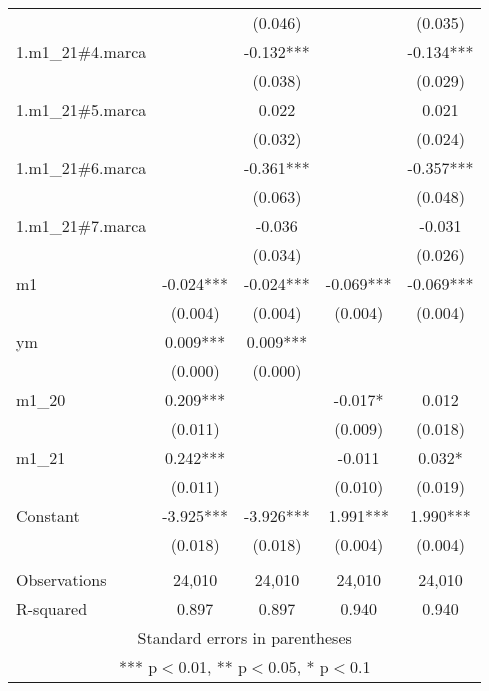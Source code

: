 \begin{tabular}{lcccc}
 &  & (0.046) &  & (0.035) \\
1.m1\_21\#4.marca &  & -0.132*** &  & -0.134*** \\
 &  & (0.038) &  & (0.029) \\
1.m1\_21\#5.marca &  & 0.022 &  & 0.021 \\
 &  & (0.032) &  & (0.024) \\
1.m1\_21\#6.marca &  & -0.361*** &  & -0.357*** \\
 &  & (0.063) &  & (0.048) \\
1.m1\_21\#7.marca &  & -0.036 &  & -0.031 \\
 &  & (0.034) &  & (0.026) \\
m1 & -0.024*** & -0.024*** & -0.069*** & -0.069*** \\
 & (0.004) & (0.004) & (0.004) & (0.004) \\
ym & 0.009*** & 0.009*** &  &  \\
 & (0.000) & (0.000) &  &  \\
m1\_20 & 0.209*** &  & -0.017* & 0.012 \\
 & (0.011) &  & (0.009) & (0.018) \\
m1\_21 & 0.242*** &  & -0.011 & 0.032* \\
 & (0.011) &  & (0.010) & (0.019) \\
Constant & -3.925*** & -3.926*** & 1.991*** & 1.990*** \\
 & (0.018) & (0.018) & (0.004) & (0.004) \\
 &  &  &  &  \\
Observations & 24,010 & 24,010 & 24,010 & 24,010 \\
 R-squared & 0.897 & 0.897 & 0.940 & 0.940 \\ \hline
\multicolumn{5}{c}{ Standard errors in parentheses} \\
\multicolumn{5}{c}{ *** p$<$0.01, ** p$<$0.05, * p$<$0.1} \\
\end{tabular}
